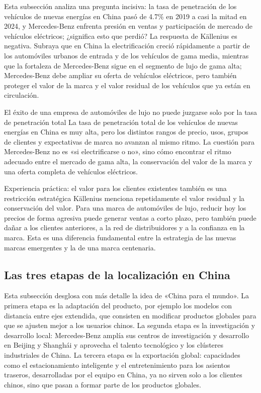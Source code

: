 \documentclass[a4paper]{article}
\begin{document}
Esta subsección analiza una pregunta incisiva: la tasa de penetración de los vehículos de nuevas energías en China pasó de 4.7\% en 2019 a casi la mitad en 2024, y Mercedes-Benz enfrenta presión en ventas y participación de mercado de vehículos eléctricos; ¿significa esto que perdió? La respuesta de Källenius es negativa. Subraya que en China la electrificación creció rápidamente a partir de los automóviles urbanos de entrada y de los vehículos de gama media, mientras que la fortaleza de Mercedes-Benz sigue en el segmento de lujo de gama alta; Mercedes-Benz debe ampliar su oferta de vehículos eléctricos, pero también proteger el valor de la marca y el valor residual de los vehículos que ya están en circulación.

\begin{warningbox}{El éxito de una empresa de automóviles de lujo no puede juzgarse solo por la tasa de penetración total}
La tasa de penetración total de los vehículos de nuevas energías en China es muy alta, pero los distintos rangos de precio, usos, grupos de clientes y expectativas de marca no avanzan al mismo ritmo. La cuestión para Mercedes-Benz no es «si electrificarse o no», sino cómo encontrar el ritmo adecuado entre el mercado de gama alta, la conservación del valor de la marca y una oferta completa de vehículos eléctricos.
\end{warningbox}

\begin{importantbox}{Experiencia práctica: el valor para los clientes existentes también es una restricción estratégica}
Källenius menciona repetidamente el valor residual y la conservación del valor. Para una marca de automóviles de lujo, reducir hoy los precios de forma agresiva puede generar ventas a corto plazo, pero también puede dañar a los clientes anteriores, a la red de distribuidores y a la confianza en la marca. Esta es una diferencia fundamental entre la estrategia de las nuevas marcas emergentes y la de una marca centenaria.
\end{importantbox}

\subsection{Las tres etapas de la localización en China}

Esta subsección desglosa con más detalle la idea de «China para el mundo». La primera etapa es la adaptación del producto, por ejemplo los modelos con distancia entre ejes extendida, que consisten en modificar productos globales para que se ajusten mejor a los usuarios chinos. La segunda etapa es la investigación y desarrollo local: Mercedes-Benz amplía sus centros de investigación y desarrollo en Beijing y Shanghái y aprovecha el talento tecnológico y los clústeres industriales de China. La tercera etapa es la exportación global: capacidades como el estacionamiento inteligente y el entretenimiento para los asientos traseros, desarrolladas por el equipo en China, ya no sirven solo a los clientes chinos, sino que pasan a formar parte de los productos globales.
\end{document}
